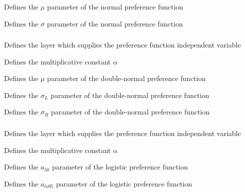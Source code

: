  {Defines the $\mu$ parameter of the normal preference function}

 {Defines the $\sigma$ parameter of the normal preference function}

\subsubsection[Double-normal]{}

 {Defines the layer which supplies the preference function independent variable}

 {Defines the multiplicative constant $\alpha$}

 {Defines the $\mu$ parameter of the double-normal preference function}

 {Defines the $\sigma_L$ parameter of the double-normal preference function}

 {Defines the $\sigma_R$ parameter of the double-normal preference function}

\subsubsection[Logistic]{}

 {Defines the layer which supplies the preference function independent variable}

 {Defines the multiplicative constant $\alpha$}

 {Defines the $a_{50}$ parameter of the logistic preference function}

 {Defines the $a_{to95}$ parameter of the logistic preference function}

\subsubsection[Inverse-logistic]{}

